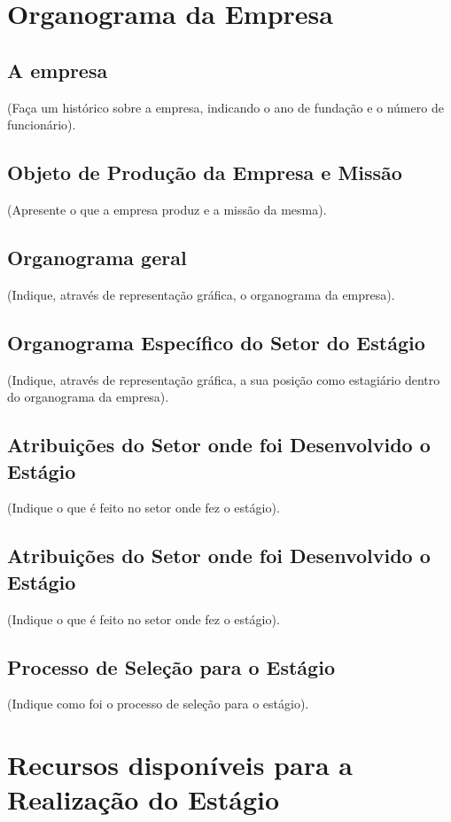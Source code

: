\documentclass[
	12pt,				%
	openright,			%
	oneside,			%
	a4paper,			%
	english,			%
	french,				%
	spanish,			%
	brazil				%
	]{abntex2}
\begin{document}
\chapter[Organograma da Empresa]{Organograma da Empresa}

\section{A empresa}
(Faça um histórico sobre a empresa, indicando o ano de fundação e o número de
funcionário).

\section{Objeto de Produção da Empresa e Missão}
(Apresente o que a empresa produz e a missão da mesma).

\section{Organograma geral}
(Indique, através de representação gráfica, o organograma da empresa).

\section{Organograma Específico do Setor do Estágio}
(Indique, através de representação gráfica, a sua posição como estagiário dentro do
organograma da empresa).

\section{Atribuições do Setor onde foi Desenvolvido o Estágio}
(Indique o que é feito no setor onde fez o estágio).

\section{Atribuições do Setor onde foi Desenvolvido o Estágio}
(Indique o que é feito no setor onde fez o estágio).

\section{Processo de Seleção para o Estágio}
(Indique como foi o processo de seleção para o estágio).

\chapter{Recursos disponíveis para a Realização do Estágio}
\end{document}

